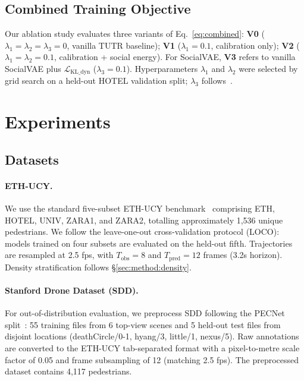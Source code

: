 \subsection{Combined Training Objective}
\label{sec:method:combined}

Our ablation study evaluates three variants of Eq.~\eqref{eq:combined}:
\textbf{V0} ($\lambda_1 = \lambda_2 = \lambda_3 = 0$, vanilla TUTR baseline);
\textbf{V1} ($\lambda_1 = 0.1$, calibration only);
\textbf{V2} ($\lambda_1 = \lambda_2 = 0.1$, calibration + social energy).
For SocialVAE, \textbf{V3} refers to vanilla SocialVAE plus
$\mathcal{L}_{\text{KL\_dyn}}$ ($\lambda_3 = 0.1$).
Hyperparameters $\lambda_1$ and $\lambda_2$ were selected by grid search
on a held-out HOTEL validation split; $\lambda_3$ follows~\cite{zhang2025owobj}.



\section{Experiments}
\label{sec:experiments}

\subsection{Datasets}
\label{sec:exp:datasets}

\paragraph{ETH-UCY.}
We use the standard five-subset ETH-UCY benchmark~\cite{pellegrini2009eth,lerner2007crowds}
comprising ETH, HOTEL, UNIV, ZARA1, and ZARA2, totalling approximately 1,536
unique pedestrians. We follow the leave-one-out cross-validation protocol
(LOCO): models trained on four subsets are evaluated on the held-out fifth.
Trajectories are resampled at 2.5 fps, with $T_{\text{obs}} = 8$ and
$T_{\text{pred}} = 12$ frames (3.2s horizon). Density stratification follows
§\ref{sec:method:density}.

\paragraph{Stanford Drone Dataset (SDD).}
For out-of-distribution evaluation, we preprocess SDD following the PECNet
split~\cite{mangalam2020pecnet}: 55 training files from 6 top-view scenes and
5 held-out test files from disjoint locations (deathCircle/0-1, hyang/3,
little/1, nexus/5). Raw annotations are converted to the ETH-UCY tab-separated
format with a pixel-to-metre scale factor of 0.05 and frame subsampling of 12
(matching 2.5 fps). The preprocessed dataset contains 4,117 pedestrians.

